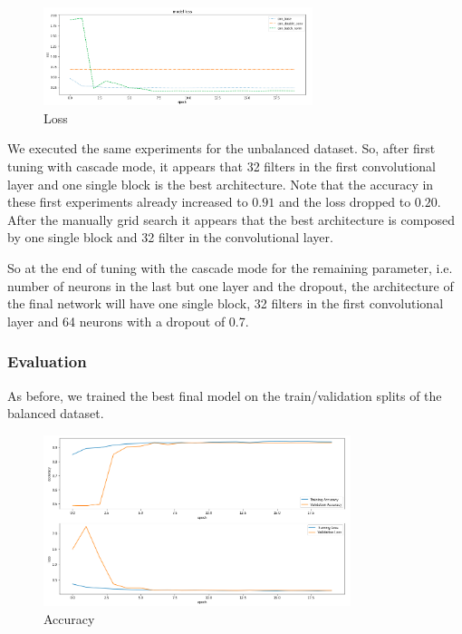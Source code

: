 \documentclass{article}
\begin{document}
\begin{figure}[H]
    \centering
    \includegraphics[width=0.7\textwidth]{images/loss_balance.png}
    \caption{Loss}
    \label{fig:loss_bal}
\end{figure}

We executed the same experiments for the unbalanced dataset. So, after first tuning with cascade mode, it appears that 32 filters in the first convolutional layer and one single block is the best architecture. Note that the accuracy in these first experiments already increased to $0.91$ and the loss dropped to $0.20$.\\
After the manually grid search it appears that the best architecture is composed by one single block and 32 filter in the convolutional layer.

So at the end of tuning with the cascade mode for the remaining parameter, i.e. number of neurons in the last but one layer and the dropout, the architecture of the final network will have one single block, 32 filters in the first convolutional layer and 64 neurons with a dropout of 0.7.

\subsubsection{Evaluation}
As before, we  trained  the  best  final  model  on  the train/validation  splits  of  the balanced dataset.

\begin{figure}[H]
    \centering
    \includegraphics[width=0.8\textwidth]{images/validation_balance.png}
    \caption{Accuracy}
    \label{fig:acc_unbalance}
\end{figure}
\end{document}
